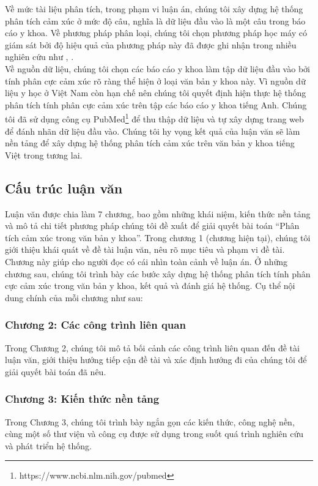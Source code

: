 Về mức tài liệu phân tích, trong phạm vi luận án, chúng tôi xây dựng hệ thống phân tích cảm xúc ở mức độ câu, nghĩa là dữ liệu đầu vào là một câu trong báo cáo y khoa. Về phương pháp phân loại, chúng tôi chọn phương pháp học máy có giám sát  bởi độ hiệu quả của phương pháp này đã được ghi nhận trong nhiều nghiên cứu như \cite{manning2009anintroduction}, \cite{chandrakala2012opinion}.\\

Về nguồn dữ liệu, chúng tôi chọn các báo cáo y khoa làm tập dữ liệu đầu vào bởi tính phân cực cảm xúc rõ ràng thể hiện ở loại văn bản y khoa này. Vì nguồn dữ liệu y học ở Việt Nam còn hạn chế nên chúng tôi quyết định hiện thực hệ thống phân tích tính phân cực cảm xúc trên tập các báo cáo y khoa tiếng Anh. Chúng tôi đã sử dụng công cụ PubMed\footnote{https://www.ncbi.nlm.nih.gov/pubmed} để thu thập dữ liệu và tự xây dựng trang web để đánh nhãn dữ liệu đầu vào. Chúng tôi hy vọng kết quả của luận văn sẽ làm nền tảng để xây dựng hệ thống phân tích cảm xúc trên văn bản y khoa tiếng Việt trong tương lai.\\
 

\subsection{Cấu trúc luận văn}
Luận văn được chia làm 7 chương, bao gồm những khái niệm, kiến thức nền tảng và mô tả chi tiết phương pháp chúng tôi đề xuất để giải quyết bài toán ``Phân tích cảm xúc trong văn bản y khoa''. Trong chương 1 (chương hiện tại), chúng tôi giới thiệu khái quát về đề tài luận văn, nêu rõ mục tiêu và phạm vi đề tài. Chương này giúp cho người đọc có cái nhìn toàn cảnh về luận án. Ở những chương sau, chúng tôi trình bày các bước xây dựng hệ thống phân tích tính phân cực cảm xúc trong văn bản y khoa, kết quả và đánh giá hệ thống. Cụ thể nội dung chính của mỗi chương như sau:

\subsubsection*{Chương 2: Các công trình liên quan}
Trong Chương 2, chúng tôi mô tả bối cảnh các công trình liên quan đến đề tài luận văn, giới thiệu hướng tiếp cận đề tài và xác định hướng đi của chúng tôi để giải quyết bài toán đã nêu.
\subsubsection*{Chương 3: Kiến thức nền tảng}
Trong Chương 3, chúng tôi trình bày ngắn gọn các kiến thức, công nghệ nền, cùng một số thư viện và công cụ được sử dụng trong suốt quá trình nghiên cứu và phát triển hệ thống.
